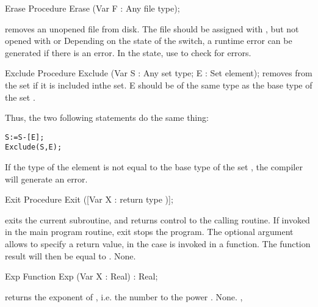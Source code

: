 
\begin{procedure}{Erase}
\Declaration
Procedure Erase (Var F : Any file type);

\Description
{} removes an unopened file from disk. The file should be
assigned with , but not opened with  or 
\Errors
Depending on the state of the  switch, a runtime error can be 
generated if there is an error. In the  state, use 
to check for errors.
\SeeAlso
{}
\end{procedure}


\begin{procedure}{Exclude}
\Declaration
Procedure Exclude (Var S : Any set type; E : Set element);
\Description
{} removes  from the set  if it is
included inthe set. E should be of the same type as the base type
of the set .

Thus, the two following statements do the same thing:
\begin{verbatim}
S:=S-[E];
Exclude(S,E);
\end{verbatim}
\Errors
If the type of the element  is not equal to the base type of the
set , the compiler will generate an error.
\SeeAlso
{}
\end{procedure}


\begin{procedure}{Exit}
\Declaration
Procedure Exit ([Var X : return type )];

\Description
{} exits the current subroutine, and returns control to the calling
routine. If invoked in the main program routine, exit stops the program.
The optional argument  allows to specify a return value, in the case
 is invoked in a function. The function result will then be
equal to .
\Errors
None.
\SeeAlso
{}
\end{procedure}


\begin{function}{Exp}
\Declaration
Function Exp (Var X : Real) : Real;

\Description
{} returns the exponent of , i.e. the number  to the
power .
\Errors
None.
\SeeAlso
{}, 
\end{function}

